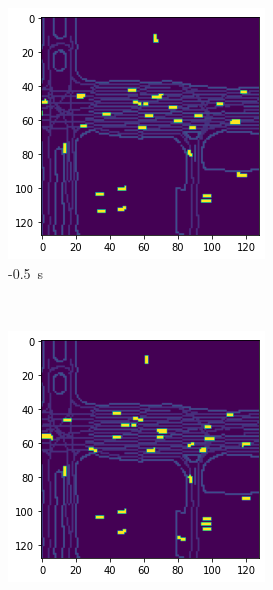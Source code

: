 \documentclass[12pt]{article}
\begin{document}
\begin{figure}[H]
\begin{subfigure}[b]{0.18\textwidth}
                \includegraphics[width=\textwidth]{output_opposite_1.png}
                \caption{-0.5~s}
            \end{subfigure}
            ~
            \begin{subfigure}[b]{0.18\textwidth}
                \includegraphics[width=\textwidth]{output_opposite_2.png}

\end{subfigure}
\end{figure}
\end{document}
